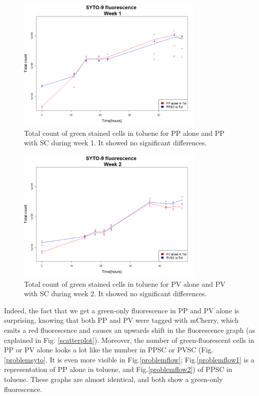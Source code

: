 \documentclass[a4paper, 10pt, conference]{ieeeconf}   %
\begin{document}
\begin{figure}
	 
	
		\centering
		\includegraphics[width=9cm]{problemw1.PNG}
		\caption{Total count of green stained cells in toluene for PP alone and PP with SC during week 1. It showed no significant differences.}
		\label{problemw1}
\end{figure}

\begin{figure}
		\centering
		\includegraphics[width=9cm]{problemw2.PNG}
		\caption{Total count of green stained cells in toluene for PV alone and PV with SC during week 2. It showed no significant differences.}
		\label{problemw2}

  
\end{figure}

 Indeed, the fact that we get a green-only fluorescence in PP and PV alone is surprising, knowing that both PP and PV were tagged with mCherry, which emits a red fluorescence and causes an upwards shift in the fluorescence graph (as explained in Fig. \ref{scatterplot}). Moreover, the number of green-fluorescent cells in PP or PV alone looks a lot like the number in PPSC or PVSC (Fig. \ref{problemsyto}.
It is even more visible in Fig.\ref{problemflow}; Fig.\ref{problemflow1} is a representation of PP alone in toluene, and Fig.\ref{problemflow2}) of PPSC in toluene. These graphs are almost identical, and both show a green-only fluorescence.
 
\end{document}
